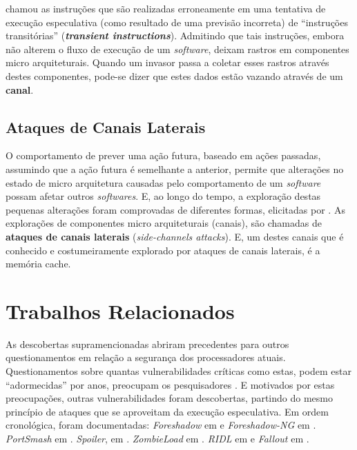 \documentclass[conference]{IEEEtran}
\begin{document}
 chamou as instruções que são realizadas erroneamente em uma tentativa de execução especulativa (como resultado de uma previsão incorreta) de ``instruções transitórias'' (\textbf{\emph{transient instructions}}). Admitindo que tais instruções, embora não alterem o fluxo de execução de um \emph{software}, deixam rastros em componentes micro arquiteturais. Quando um invasor passa a coletar esses rastros através destes componentes, pode-se dizer que estes dados estão vazando através de um \textbf{canal}.

\subsection{Ataques de Canais Laterais}
O comportamento de prever uma ação futura, baseado em ações passadas, assumindo que a ação futura é semelhante a anterior, permite que alterações no estado de micro arquitetura causadas pelo comportamento de um \emph{software} possam afetar outros \emph{softwares}. E, ao longo do tempo, a exploração destas pequenas alterações foram comprovadas de diferentes formas, elicitadas por . As explorações de componentes micro arquiteturais (canais), são chamadas de \textbf{ataques de canais laterais} (\emph{side-channels attacks}). E, um destes canais que é conhecido e costumeiramente explorado por ataques de canais laterais, é a memória cache.

\section{Trabalhos Relacionados}
As descobertas supramencionadas abriram precedentes para outros questionamentos em relação a segurança dos processadores atuais. Questionamentos sobre quantas vulnerabilidades críticas como estas, podem estar ``adormecidas'' por anos, preocupam os pesquisadores \cite{Andy2018Triple}. E motivados por estas preocupações, outras vulnerabilidades foram descobertas, partindo do mesmo princípio de ataques que se aproveitam da execução especulativa. Em ordem cronológica, foram documentadas: \emph{Foreshadow} em  e \emph{Foreshadow-NG} em . \emph{PortSmash} em . \emph{Spoiler}, em . \emph{ZombieLoad} em . \emph{RIDL} em  e \emph{Fallout} em .
\end{document}
